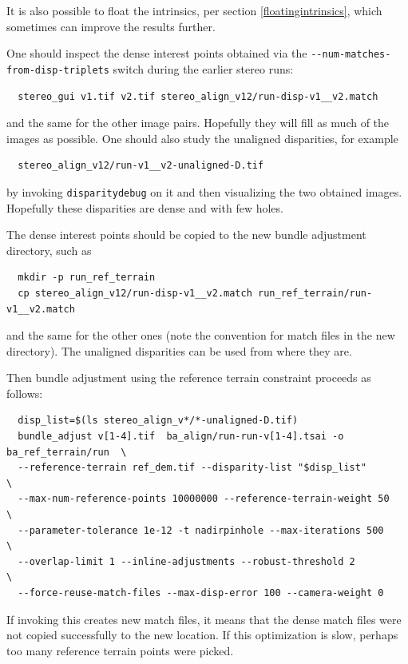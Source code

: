 It is also possible to float the intrinsics, per section \ref{floatingintrinsics},
which sometimes can improve the results further. 

One should inspect the dense interest points obtained via the
\texttt{-\/-num-matches-from-disp-triplets} switch during the earlier stereo
runs:

\begin{verbatim}
  stereo_gui v1.tif v2.tif stereo_align_v12/run-disp-v1__v2.match
\end{verbatim}
and the same for the other image pairs. Hopefully they will fill as much
of the images as possible. One should also study the unaligned disparities,
for example
\begin{verbatim}
  stereo_align_v12/run-v1__v2-unaligned-D.tif
\end{verbatim}
by invoking \texttt{disparitydebug} on it and then visualizing the two
obtained images. Hopefully these disparities are dense and with few holes. 

The dense interest points should be copied to the new bundle adjustment directory, such as
\begin{verbatim}
  mkdir -p run_ref_terrain
  cp stereo_align_v12/run-disp-v1__v2.match run_ref_terrain/run-v1__v2.match
\end{verbatim}

and the same for the other ones (note the convention for match files in the new directory).
The unaligned disparities can be used from where they are. 

Then bundle adjustment using the reference terrain constraint proceeds as follows:
\begin{verbatim}
  disp_list=$(ls stereo_align_v*/*-unaligned-D.tif)
  bundle_adjust v[1-4].tif  ba_align/run-run-v[1-4].tsai -o ba_ref_terrain/run  \
  --reference-terrain ref_dem.tif --disparity-list "$disp_list"                 \
  --max-num-reference-points 10000000 --reference-terrain-weight 50             \ 
  --parameter-tolerance 1e-12 -t nadirpinhole --max-iterations 500              \
  --overlap-limit 1 --inline-adjustments --robust-threshold 2                   \
  --force-reuse-match-files --max-disp-error 100 --camera-weight 0
\end{verbatim}

If invoking this creates new match files, it means that the dense match files 
were not copied successfully to the new location. If this optimization is slow,
perhaps too many reference terrain points were picked. 

